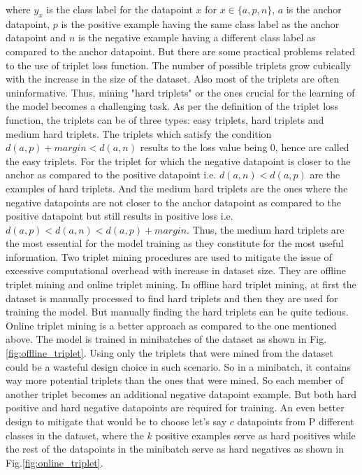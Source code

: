 where $y_{x}$ is the class label for the datapoint $x$ for $x \in \{a,p,n\}$, $a$ is the anchor datapoint, $p$ is the positive example having the same class label as the anchor datapoint and $n$ is the negative example having a different class label as compared to the anchor datapoint. But there are some practical problems related to the use of triplet loss function. The number of possible triplets grow cubically with the increase in the size of the dataset. Also most of the triplets are often uninformative. Thus, mining "hard triplets" or the ones crucial for the learning of the model becomes a challenging task. As per the definition of the triplet loss function, the triplets can be of three types: easy triplets, hard triplets and medium hard triplets. The triplets which satisfy the condition $d(a,p)+margin<d(a,n)$ results to the loss value being 0, hence are called the easy triplets\cite{triplet_loss}. For the triplet for which the negative datapoint is closer to the anchor as compared to the positive datapoint i.e. $d(a,n)<d(a,p)$ are the examples of hard triplets.\cite{triplet_loss} And the medium hard triplets are the ones where the negative datapoints are not closer to the anchor datapoint as compared to the positive datapoint but still results in positive loss i.e. $d(a,p)<d(a,n)<d(a,p)+margin$.\cite{triplet_loss} Thus, the medium hard triplets are the most essential for the model training as they constitute for the most useful information. Two triplet mining procedures are used to mitigate the issue of excessive computational overhead with increase in dataset size. They are offline triplet mining and online triplet mining. In offline hard triplet mining, at first the dataset is manually processed to find hard triplets and then they are used for training the model. But manually finding the hard triplets can be quite tedious. Online triplet mining is a better approach as compared to the one mentioned above. The model is trained in minibatches of the dataset as shown in Fig.\ref{fig:offline_triplet}. Using only the triplets that were mined from the dataset could be a wasteful design choice in such scenario. So in a minibatch, it contains way more potential triplets than the ones that were mined. So each member of another triplet becomes an additional negative datapoint example. But both hard positive and hard negative datapoints are required for training. An even better design to mitigate that would be to choose let's say $c$ datapoints from P different classes in the dataset, where the $k$ positive examples serve as hard positives while the rest of the datapoints in the minibatch serve as hard negatives as shown in Fig.\ref{fig:online_triplet}.\cite{hermans2017defense}

